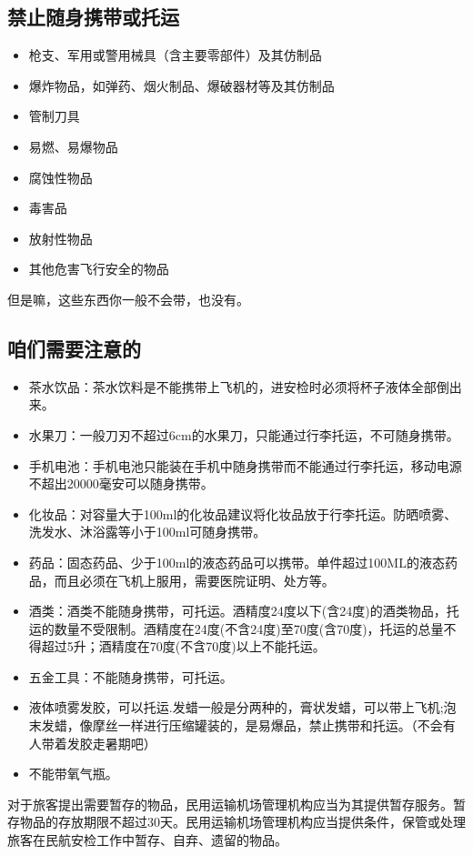 \documentclass{ctexbook}
\begin{document}
\subsection{禁止随身携带或托运}
\begin{itemize}
    \item 枪支、军用或警用械具（含主要零部件）及其仿制品
    \item 爆炸物品，如弹药、烟火制品、爆破器材等及其仿制品
    \item 管制刀具
    \item 易燃、易爆物品
    \item 腐蚀性物品
    \item 毒害品
    \item 放射性物品
    \item 其他危害飞行安全的物品
\end{itemize}
但是嘛，这些东西你一般不会带，也没有。
\subsection{咱们需要注意的}
\begin{itemize}
    \item 茶水饮品：茶水饮料是不能携带上飞机的，进安检时必须将杯子液体全部倒出来。
    \item 水果刀：一般刀刃不超过6cm的水果刀，只能通过行李托运，不可随身携带。
    \item 手机电池：手机电池只能装在手机中随身携带而不能通过行李托运，移动电源不超出20000毫安可以随身携带。
    \item 化妆品：对容量大于100ml的化妆品建议将化妆品放于行李托运。防晒喷雾、洗发水、沐浴露等小于100ml可随身携带。
    \item 药品：固态药品、少于100ml的液态药品可以携带。单件超过100ML的液态药品，而且必须在飞机上服用，需要医院证明、处方等。
    \item 酒类：酒类不能随身携带，可托运。酒精度24度以下(含24度)的酒类物品，托运的数量不受限制。酒精度在24度(不含24度)至70度(含70度)，托运的总量不得超过5升；酒精度在70度(不含70度)以上不能托运。
    \item 五金工具：不能随身携带，可托运。
    \item 液体喷雾发胶，可以托运.发蜡一般是分两种的，膏状发蜡，可以带上飞机;泡末发蜡，像摩丝一样进行压缩罐装的，是易爆品，禁止携带和托运。（不会有人带着发胶走暑期吧）
    \item 不能带氧气瓶。 
\end{itemize}
对于旅客提出需要暂存的物品，民用运输机场管理机构应当为其提供暂存服务。暂存物品的存放期限不超过30天。民用运输机场管理机构应当提供条件，保管或处理旅客在民航安检工作中暂存、自弃、遗留的物品。
\end{document}

